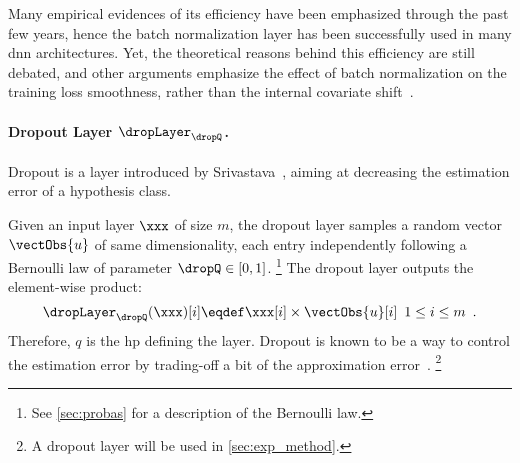 Many empirical evidences of its efficiency have been emphasized through the past few years, hence the batch normalization layer has been successfully used in many \gls{dnn} architectures.
Yet, the theoretical reasons behind this efficiency are still debated, and other arguments emphasize the effect of batch normalization on the training loss smoothness, rather than the internal covariate shift~\cite{santurkar_how_2018}.

\paragraph{Dropout Layer \(\dropLayer_\dropQ\).}
Dropout is a layer introduced by Srivastava~\cite{srivastava_dropout_2014}, aiming at decreasing the estimation error of a hypothesis class.

Given an input layer \(\xxx\) of size \(m\), the dropout layer samples a random vector \(\vectObs{u}\) of same dimensionality, each entry independently following a Bernoulli law of parameter \(\dropQ \in [0,1]\).%
\footnote{
	See \autoref{sec:probas} for a description of the Bernoulli law.
}
The dropout layer outputs the element-wise product:
\begin{equation}
	\dropLayer_\dropQ(\xxx)[i] \eqdef \xxx[i] \times \vectObs{u}[i] \enspace 1 \leq i \leq m \enspace .
\end{equation}
Therefore, \(q\) is the \gls{hp} defining the layer.
Dropout is known to be a way to control the estimation error by trading-off a bit of the approximation error~\cite[Sec.~7.12]{goodfellow_deep_2017}.%
\footnote{
	A dropout layer will be used in \autoref{sec:exp_method}.
}

